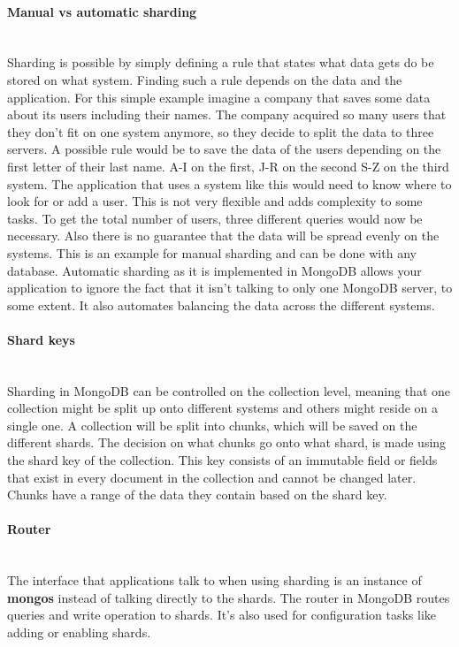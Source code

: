 \documentclass[11pt]{article}
\begin{document}
\paragraph{Manual vs automatic sharding} \mbox{}\\
Sharding is possible by simply defining a rule that states what data gets do be stored on what system.
Finding such a rule depends on the data and the application. 
For this simple example imagine a company that saves some data about its users including their names. The company acquired so many users that they don't fit on one system anymore, so they decide to split the data to three servers. 
A possible rule would be to save the data of the users depending on the first letter of their last name. A-I on the first, J-R on the second S-Z on the third system. 
The application that uses a system like this would need to know where to look for or add a user. This is not very flexible and adds complexity to some tasks. 
To get the total number of users, three different queries would now be necessary. Also there is no guarantee that the data will be spread evenly on the systems. 
This is an example for manual sharding and can be done with any database.
Automatic sharding as it is implemented in MongoDB allows your application to ignore the fact that it isn't talking to only one MongoDB server, to some extent. 
It also automates balancing the data across the different systems. 
\cite{automatic_sharding}

\paragraph{Shard keys} \mbox{}\\
Sharding in MongoDB can be controlled on the collection level, meaning that one collection might be split up onto different systems and others might reside on a single one.
A collection will be split into chunks, which will be saved on the different shards.
The decision on what chunks go onto what shard, is made using the shard key of the collection. 
This key consists of an immutable field or fields that exist in every document in the collection and cannot be changed later. 
Chunks have a range of the data they contain based on the shard key.
\cite{shard_keys}

\paragraph{Router} \mbox{}\\
The interface that applications talk to when using sharding is an instance of \textbf{mongos} instead of talking directly to the shards. 
The router in MongoDB routes queries and write operation to shards. 
\cite{router}
It's also used for configuration tasks like adding or enabling shards.
\end{document}
